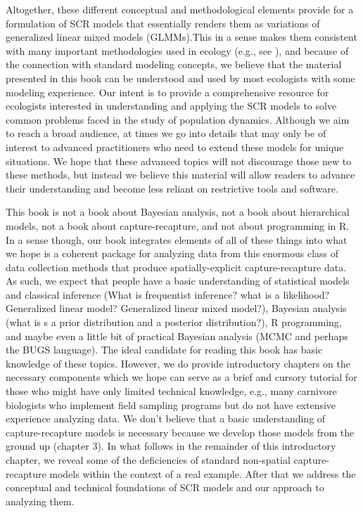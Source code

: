 Altogether, these different conceptual and methodological elements
provide for a formulation of SCR models that essentially renders them
as variations of generalized linear mixed models (GLMMs).This in a
sense makes them consistent with many important methodologies used in
ecology (e.g., see \citet{zuur_etal:2009, kery_etal:2010}), and
because of the connection with standard modeling concepts, we believe
that the material presented in this book can be understood and used by
most ecologists with some modeling experience. Our intent is to
provide a comprehensive resource for ecologists interested in
understanding and applying the SCR models to solve common problems
faced in the study of population dynamics. Although we aim to reach a
broad audience, at times we go into details that may only be of
interest to advanced practitioners who need to extend these models for
unique situations.  We hope that these advanced topics will not
discourage those new to these methods, but instead we believe this
material will allow readers to advance their understanding and become
less reliant on restrictive tools and software.

This book is not a book about Bayesian analysis, not a book about
hierarchical models, not a book about capture-recapture, and not about
programming in R. In a sense though, our book integrates elements of
all of these things into what we hope is a coherent package for
analyzing data from this enormous class of data collection methods
that produce spatially-explicit capture-recapture data.   As such, we
expect that people have a basic understanding of statistical models
and classical inference (What is frequentist inference? what is a
likelihood? Generalized linear model? Generalized linear mixed
model?), Bayesian analysis (what is s a prior distribution and a
posterior distribution?), R programming, and maybe even a little bit
of practical Bayesian analysis (MCMC and perhaps the BUGS language).
The ideal candidate for reading this book has basic knowledge of these
topics. However, we do provide introductory chapters on the necessary
components which we hope can serve as a brief and cursory tutorial for
those who might have only limited technical knowledge, e.g., many
carnivore biologists who implement field sampling programs but do not
have extensive experience analyzing data. We don't believe that a
basic understanding of capture-recapture models is necessary because
we develop those models from the ground up (chapter 3). In what
follows in the remainder of this introductory chapter, we reveal some
of the deficiencies of standard non-spatial capture-recapture models
within the context of a real example. After that we address the
conceptual and technical foundations of SCR models and our approach to
analyzing them. 


